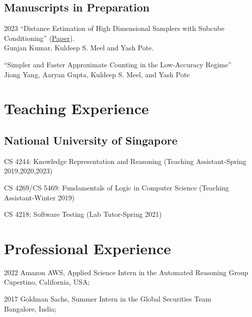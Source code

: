 \documentclass[12pt,letterpaper]{report}
\newcommand{\listitemspace}{0.15em}
\renewenvironment{itemize}
{\begin{list}{}{\setlength{\leftmargin}{0em}
            \setlength{\parskip}{0em}
            \setlength{\itemsep}{\listitemspace}
            \setlength{\parsep}{\listitemspace}}}
    {\end{list}}
\begin{document}
    \subsection*{Manuscripts in Preparation}

    \begin{tablist}
    	\item[2023] \tab  	\enquote{Distance Estimation of High Dimensional Samplers with Subcube Conditioning} (\href{https://arxiv.org/abs/2308.04264}{Paper}).\\
    	 Gunjan Kumar,  Kuldeep S. Meel and Yash Pote.
    	
    	\item[\the\year] \tab  	\enquote{Simpler and Faster Approximate Counting in the Low-Accuracy Regime}\\
    	Jiong Yang, Aaryan Gupta, Kuldeep S. Meel,  and Yash Pote
    \end{tablist}


    \section*{Teaching Experience}

    \subsection*{National University of Singapore}
    
    \begin{itemize}
    	  	
 \item   CS 4244: Knowledge Representation and Reasoning (Teaching Assistant-Spring 2019,2020,2023)
  \item   CS 4269/CS 5469: Fundamentals of Logic in Computer Science (Teaching Assistant-Winter 2019)
  \item   CS 4218: Software Testing (Lab Tutor-Spring 2021)
    
	\end{itemize}
    
    \section*{Professional Experience}
    \begin{tablist}
        \item[2022] \tab Amazon AWS, Applied Science Intern in the Automated Reasoning Group\\
        Cupertino, California, USA;
    \end{tablist}
    \begin{tablist}
        \item[2017] \tab Goldman Sachs, Summer Intern in the Global Securities Team\\
        Bangalore, India;
    \end{tablist}
\end{document}
